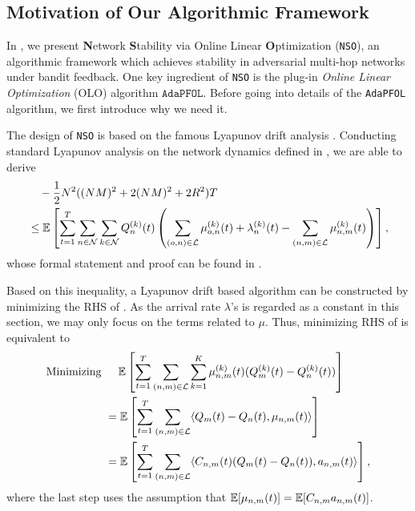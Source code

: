 \documentclass[11pt,fullpage,letterpaper]{article} %
\renewcommand{\bm}[1]{#1}%
\newcommand{\E}{\operatornamewithlimits{\mathbb{E}}}
\newcommand{\mN}{{\mathcal N}}
\newcommand{\mL}{{\mathcal L}}
\newcommand{\SSAlg}{\texttt{NSO}\xspace}
\newcommand{\OLOAlg}{\texttt{AdaPFOL}\xspace}
\newcommand{\OLO}{\OLOAlg}
\begin{document}
\subsection{Motivation of Our Algorithmic Framework}\label{sec:multi-hop stability sketch}

In , we present \textbf{N}etwork \textbf{S}tability via Online Linear \textbf{O}ptimization (\SSAlg), an algorithmic framework which achieves stability in adversarial multi-hop networks under bandit feedback.
One key ingredient of \SSAlg is the plug-in \textit{Online Linear Optimization} (OLO) algorithm $\OLO$.
Before going into details of the \OLOAlg algorithm, we first introduce why we need it.

The design of \SSAlg is based on the famous Lyapunov drift analysis \citep[\S 4]{neely2010stochastic}. Conducting standard Lyapunov analysis on the network dynamics defined in , we are able to derive
\begin{align}
&\quad -\frac 12 N^2 ((NM)^2+2(NM)^2+2R^2) T \nonumber\\
&\le \E\left [\sum_{t=1}^T \sum_{n\in \mN} \sum_{k\in \mN} Q_{n}^{(k)}(t) \left (\sum_{(o,n)\in \mL} \mu_{o,n}^{(k)}(t) + \lambda_n^{(k)}(t) - \sum_{(n,m)\in \mL} \mu_{n,m}^{(k)}(t) \right )\right ],\label{eq:multi-hop stability Lyapunov informal}
\end{align}
whose formal statement and proof can be found in .

Based on this inequality, a Lyapunov drift based algorithm can be constructed by  minimizing the RHS of  \citep[\S 4]{neely2010stochastic}.  
As the arrival rate $\lambda$'s is regarded as a constant in this section, we may only focus on the terms related to $\mu$. Thus, minimizing RHS of  is equivalent to
\begin{align}
\text{Minimizing }&\quad \E\left [\sum_{t=1}^T \sum_{(n,m)\in \mL} \sum_{k=1}^K \mu_{n,m}^{(k)}(t) (Q_m^{(k)}(t)-Q_n^{(k)}(t))\right ] \nonumber\\
&=\E\left [\sum_{t=1}^T \sum_{(n,m)\in \mL} \langle \bm Q_m(t)-\bm Q_n(t),\bm \mu_{n,m}(t)\rangle\right ]\nonumber\\
&=\E\left [\sum_{t=1}^T \sum_{(n,m)\in \mL} \langle C_{n,m}(t) (\bm Q_m(t)-\bm Q_n(t)),\bm a_{n,m}(t)\rangle\right ], \label{eq:multi-hop stability OLO objective informal}
\end{align}
where the last step uses the assumption that $\E[\bm \mu_{n,m}(t)]=\E[C_{n,m} \bm a_{n,m}(t)]$.
\end{document}

